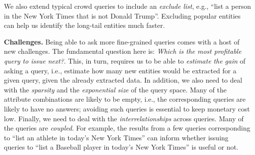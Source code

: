 

We also extend typical crowd queries to include an {\em exclude list}, e.g., ``list a person in the New York Times that is not Donald Trump''.  Excluding popular entities can help us identify the long-tail entities much faster.



\noindent
{\bf Challenges.} 
Being able to ask more fine-grained queries comes with a host of new challenges. The fundamental question here is: {\em Which is the most profitable query to issue next?}. This, in turn, requires us to be able to {\em estimate the gain} of asking a query, i.e., estimate how many new entities would be extracted for a given query, given the already extracted data. In addition, we also need to deal with the {\em sparsity} and the {\em exponential size} of the query space. Many of the attribute combinations are likely to be empty, i.e., the corresponding queries are likely to have no answers; avoiding such queries is essential to keep monetary cost low. Finally, we need to deal with the {\em interrelationships} across queries. Many of the queries are {\em coupled}. For example, the results from a few queries corresponding to ``list an athlete in today's New York Times'' can inform whether issuing queries to ``list a Baseball player in today's New York Times'' is useful or not. 




